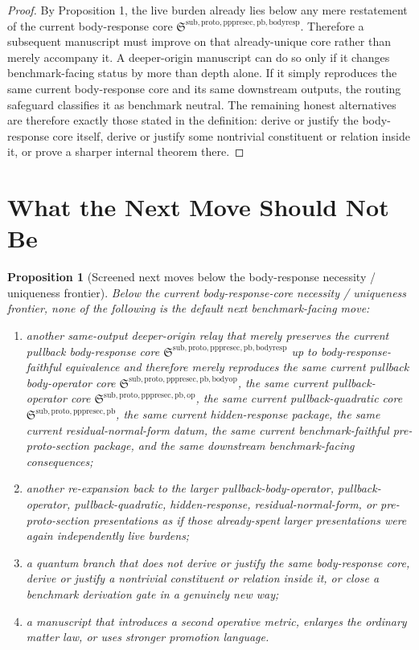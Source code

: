 \documentclass[11pt]{article}
\newcommand{\PrePreProtoSectionPullbackCore}{\mathfrak S^{\mathrm{sub,proto,pppresec,pb}}}
\newcommand{\PullbackOperatorCore}{\mathfrak S^{\mathrm{sub,proto,pppresec,pb,op}}}
\newcommand{\PullbackBodyOperatorCore}{\mathfrak S^{\mathrm{sub,proto,pppresec,pb,bodyop}}}
\newcommand{\PullbackBodyResponseCore}{\mathfrak S^{\mathrm{sub,proto,pppresec,pb,bodyresp}}}
\newtheorem{proposition}{Proposition}
\begin{document}
\begin{proof}
By Proposition 1, the live burden already lies below any mere restatement of the current body-response core \(\PullbackBodyResponseCore\). Therefore a subsequent manuscript must improve on that already-unique core rather than merely accompany it. A deeper-origin manuscript can do so only if it changes benchmark-facing status by more than depth alone. If it simply reproduces the same current body-response core and its same downstream outputs, the routing safeguard classifies it as benchmark neutral. The remaining honest alternatives are therefore exactly those stated in the definition: derive or justify the body-response core itself, derive or justify some nontrivial constituent or relation inside it, or prove a sharper internal theorem there.
\end{proof}

\section{What the Next Move Should Not Be}

\begin{proposition}[Screened next moves below the body-response necessity / uniqueness frontier]
Below the current body-response-core necessity / uniqueness frontier, none of the following is the default next benchmark-facing move:
\begin{enumerate}
    \item another same-output deeper-origin relay that merely preserves the current pullback body-response core \(\PullbackBodyResponseCore\) up to body-response-faithful equivalence and therefore merely reproduces the same current pullback body-operator core \(\PullbackBodyOperatorCore\), the same current pullback-operator core \(\PullbackOperatorCore\), the same current pullback-quadratic core \(\PrePreProtoSectionPullbackCore\), the same current hidden-response package, the same current residual-normal-form datum, the same current benchmark-faithful pre-proto-section package, and the same downstream benchmark-facing consequences;
    \item another re-expansion back to the larger pullback-body-operator, pullback-operator, pullback-quadratic, hidden-response, residual-normal-form, or pre-proto-section presentations as if those already-spent larger presentations were again independently live burdens;
    \item a quantum branch that does not derive or justify the same body-response core, derive or justify a nontrivial constituent or relation inside it, or close a benchmark derivation gate in a genuinely new way;
    \item a manuscript that introduces a second operative metric, enlarges the ordinary matter law, or uses stronger promotion language.
\end{enumerate}
\end{proposition}
\end{document}
